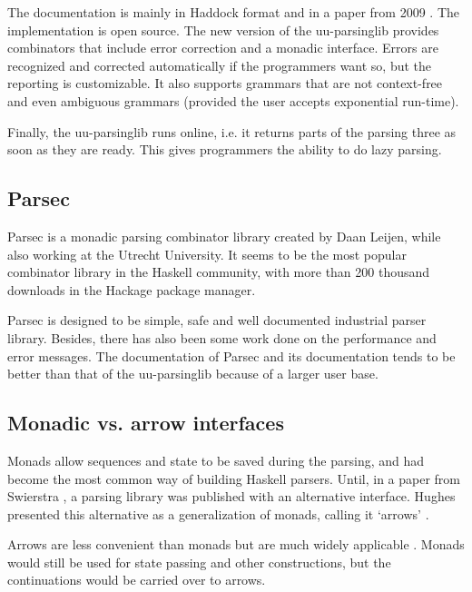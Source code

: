 The documentation is mainly in Haddock format and in a paper from 2009 \cite{uu-doc}.
The implementation is open source.
The new version of the uu-parsinglib provides combinators that include error correction and a monadic interface.
Errors are recognized and corrected automatically if the programmers want so, but the reporting is customizable.
It also supports grammars that are not context-free and even ambiguous grammars (provided the user accepts exponential run-time).

Finally, the uu-parsinglib runs online, i.e. it returns parts of the parsing three as soon as they are ready.
This gives programmers the ability to do lazy parsing.

\subsection{Parsec}
%
Parsec is a monadic parsing combinator library created by Daan Leijen, while also working at the Utrecht University.
It seems to be the most popular combinator library in the Haskell community, with more than 200 thousand downloads in the Hackage package manager.

Parsec is designed to be simple, safe and well documented industrial parser library.
Besides, there has also been some work done on the performance and error messages.
The documentation of Parsec and its documentation tends to be better than that of the uu-parsinglib because of a larger user base.


\subsection{Monadic vs. arrow interfaces}
Monads allow sequences and state to be saved during the parsing, and had become the most common way of building Haskell parsers.
Until, in a paper from Swierstra \cite{error-correcting}, a parsing library was published with an alternative interface.
Hughes presented this alternative as a generalization of monads, calling it `arrows' \cite{monad-arrows}.

Arrows are less convenient than monads but are much widely applicable \cite{monad-arrows}.
Monads would still be used for state passing and other constructions, but the continuations would be carried over to arrows.


